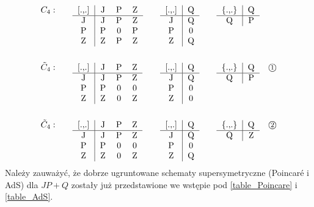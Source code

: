 \documentclass[12pt,a4paper]{article}
\begin{document}
\begin{equation*}
	\begin{array}{llllllll}
		C_{4}: &  &
		\begin{tabular}[t]{c|ccc}
			\lbrack .,.] & J & P & Z \\ \hline
			J & J & P & Z \\
			P & P & 0 & P \\
			Z & Z & P & Z
		\end{tabular}
		&  &
		\begin{tabular}[t]{c|c}
			\lbrack .,.] & Q \\ \hline
			J & Q \\
			P & 0 \\
			Z & Q
		\end{tabular}
		&  &
		\begin{tabular}[t]{c|c}
			\{.,.\} & Q \\ \hline
			Q & P
		\end{tabular}
		&  \\[55pt]
		\tilde{C}_{4}: &  &
		\begin{tabular}[t]{c|ccc}
			\lbrack .,.] & J & P & Z \\ \hline
			J & J & P & Z \\
			P & P & 0 & 0 \\
			Z & Z & 0 & Z%
		\end{tabular}
		&  &
		\begin{tabular}[t]{c|c}
			\lbrack .,.] & Q \\ \hline
			J & Q \\
			P & 0 \\
			Z & 0
		\end{tabular}
		&  &
		\begin{tabular}[t]{c|c}
			\{.,.\} & Q \\ \hline
			Q & P
		\end{tabular}
		& $\textcircled{\footnotesize 1}$ \\[55pt]
		\tilde{C}_{4}: &  &
		\begin{tabular}[t]{c|ccc}
			\lbrack .,.] & J & P & Z \\ \hline
			J & J & P & Z \\
			P & P & 0 & 0 \\
			Z & Z & 0 & Z%
		\end{tabular}
		&  &
		\begin{tabular}[t]{c|c}
			\lbrack .,.] & Q \\ \hline
			J & Q \\
			P & 0 \\
			Z & Q
		\end{tabular}
		&  &
		\begin{tabular}[t]{c|c}
			\{.,.\} & Q \\ \hline
			Q & Z
		\end{tabular}
		& $\textcircled{\footnotesize 2}$ 
	\end{array}
\end{equation*}
Należy zauważyć, że dobrze ugruntowane schematy supersymetryczne (Poincaré i AdS) dla $JP+Q$ zostały już przedstawione we wstępie pod \eqref{table_Poincare} i \eqref{table_AdS}.
\end{document}
